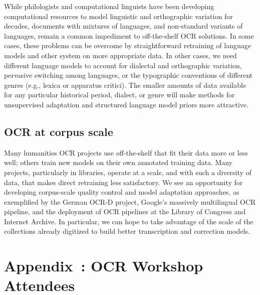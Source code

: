 \documentclass[twoside,11pt]{report}
\newcounter{appcounter}
\renewcommand{\theappcounter}{\Alph{appcounter}}
\renewcommand{\appendix}[2]{\refstepcounter{appcounter}%
  \label{app:#1}%
  \section{Appendix~\theappcounter: #2}%
  \label{sec:app-#1}}
\begin{document}
While philologists and computational linguists have been developing computational resources to model linguistic and orthographic variation for decades, documents with mixtures of languages, and non-standard variants of languages, remain a common impediment to off-the-shelf OCR solutions. In some cases, these problems can be overcome by straightforward retraining of language models and other system on more appropriate data. In other cases, we need different language models to account for dialectal and orthographic variation, pervasive switching among languages, or the typographic conventions of different genres (e.g., lexica or apparatus critici). The smaller amounts of data available for any particular historical period, dialect, or genre will make methods for unsupervised adaptation and structured language model priors more attractive.

\subsection{OCR at corpus scale}

Many humanities OCR projects use off-the-shelf that fit their data more or less well; others train new models on their own annotated training data. Many projects, particularly in libraries, operate at a scale, and with such a diversity of data, that makes direct retraining less satisfactory. We see an opportunity for developing corpus-scale quality control and model adaptation approaches, as exemplified by the German OCR-D project, Google's massively multilingual OCR pipeline, and the deployment of OCR pipelines at the Library of Congress and Internet Archive. In particular, we can hope to take advantage of the scale of the collections already digitized to build better transcription and correction models.

\appendix{participants}{OCR Workshop Attendees}
\end{document}
